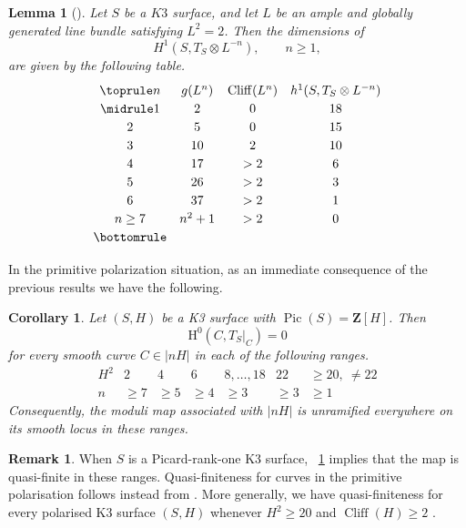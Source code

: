 \documentclass[a4paper,12pt,twoside,reqno]{amsart}
\makeatletter
\numberwithin{equation}{section}
\def\cr@pref#1:#2\@nil{#1}
\newcommand{\cr@tsing}[1]{\@nameuse{cr@map@\cr@pref#1:\@nil}}
\newcommand{\Cref}[1]{\cr@tsing{#1}~\ref{#1}}
\theoremstyle{plain}
\newtheorem{lemma}[theorem]{Lemma}
\newtheorem{corollary}[theorem]{Corollary}
\theoremstyle{definition}
\newtheorem{remark}[theorem]{Remark}
\DeclareMathOperator{\Pic}{Pic}
\newcommand{\ZZ}{\mathbf{Z}}
\newcommand{\HH}{\mathrm{H}}
\theoremstyle{plain}
\theoremstyle{definition}
\makeatother
\begin{document}
\begin{lemma}[{\cite[Lemma~3.7]{DedieuSernesi}}]
Let $S$ be a $K3$ surface, and let $L$ be an ample and globally
generated line bundle satisfying $L^2=2$. Then the dimensions of
\[
H^1\!\left(S,T_S\otimes L^{-n}\right), \qquad n\geq 1,
\]
are given by the following table.
\[
\renewcommand{\arraystretch}{1.2}
\begin{array}{@{}cccc@{}}
\toprule
n & g(L^n) & \operatorname{Cliff}(L^n)
& h^1\!\left(S,T_S\otimes L^{-n}\right) \\
\midrule
1      &  2      & 0  & 18 \\
2      &  5      & 0  & 15 \\
3      & 10      & 2  & 10 \\
4      & 17      & >2 &  6 \\
5      & 26      & >2 &  3 \\
6      & 37      & >2 &  1 \\
n\geq7 & n^2+1   & >2 &  0 \\
\bottomrule
\end{array}
\]
\end{lemma}



In the primitive polarization situation, as an immediate consequence of the previous results we have the following.
\begin{corollary}\label{cor:knutsen-double}
Let $(S,H)$ be a K3 surface with $\Pic(S)=\ZZ[H]$. Then
\[
\HH^0(C,T_S|_C)=0
\]
for every smooth curve $C\in|nH|$ in each of the following ranges.
\[
\begin{array}{c|cccccc}
H^2 & 2 & 4 & 6 & 8,\ldots,18 & 22 & \geq 20,\ \neq 22\\
\hline
n   & \geq 7 & \geq 5 & \geq 4 & \geq 3 & \geq 3 & \geq 1
\end{array}
\]
Consequently, the moduli map associated with $|nH|$ is unramified everywhere on its smooth locus in these ranges.
\end{corollary}


\begin{remark} 
\label{remark-quasifiniteness}
When $S$ is a Picard-rank-one K3 surface, \Cref{cor:knutsen-double} implies that the map is quasi-finite in these ranges. Quasi-finiteness for curves in the primitive polarisation follows instead from \cite[Theorem~A]{CG}. More generally, we have quasi-finiteness for every polarised K3 surface $(S,H)$ whenever $H^2 \geq 20$ and $\operatorname{Cliff}(H) \geq 2$ \cite[Proposition~8.6]{CDS}.
\end{remark}
\end{document}
